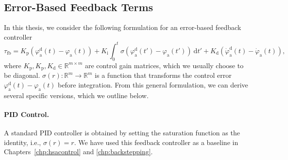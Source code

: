 \subsection{Error-Based Feedback Terms}\label{sub:background:model_based_control:feedback_terms}
In this thesis, we consider the following formulation for an error-based feedback controller
\begin{equation}
    \tau_\mathrm{fb} = K_\mathrm{p} \left (\varphi_\mathrm{a}^\mathrm{d}(t) - \varphi_\mathrm{a}(t) \right ) + K_\mathrm{i} \int_0^t \sigma \left ( \varphi_{\mathrm{a}}^\mathrm{d}(t')-\varphi_{\mathrm{a}}(t') \right ) \: \mathrm{d} t' + K_\mathrm{d} \left ( \dot{\varphi}_\mathrm{a}^\mathrm{d}(t) - \dot{\varphi}_\mathrm{a}(t) \right ),
\end{equation}
where $K_\mathrm{p}, K_\mathrm{p}, K_\mathrm{d} \in \mathbb{R}^{m \times m}$ are control gain matrices, which we usually choose to be diagonal. 
$\sigma(r): \mathbb{R}^m \to \mathbb{R}^m$ is a function that transforms the control error $\varphi_{\mathrm{a}}^\mathrm{d}(t)-\varphi_{\mathrm{a}}(t)$ before integration. From this general formulation, we can derive several specific versions, which we outline below.

\paragraph{PID Control.} A standard PID controller is obtained by setting the saturation function as the identity, i.e., $\sigma(r) = r$. We have used this feedback controller as a baseline in Chapters~\ref{chp:hsacontrol} and \ref{chp:backstepping}.

